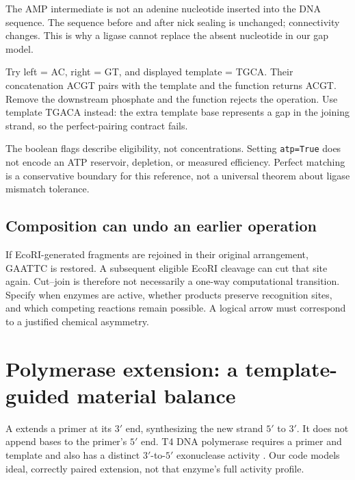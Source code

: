 
The AMP intermediate is not an adenine nucleotide inserted into the DNA sequence. The sequence before and after nick sealing is unchanged; connectivity changes. This is why a ligase cannot replace the absent nucleotide in our gap model.


Try left = AC, right = GT, and displayed template = TGCA. Their concatenation ACGT pairs with the template and the function returns ACGT. Remove the downstream phosphate and the function rejects the operation. Use template TGACA instead: the extra template base represents a gap in the joining strand, so the perfect-pairing contract fails.

The boolean flags describe eligibility, not concentrations. Setting \texttt{atp=True} does not encode an ATP reservoir, depletion, or measured efficiency. Perfect matching is a conservative boundary for this reference, not a universal theorem about ligase mismatch tolerance.

\subsection{Composition can undo an earlier operation}

If EcoRI-generated fragments are rejoined in their original arrangement, GAATTC is restored. A subsequent eligible EcoRI cleavage can cut that site again. Cut--join is therefore not necessarily a one-way computational transition. Specify when enzymes are active, whether products preserve recognition sites, and which competing reactions remain possible. A logical arrow must correspond to a justified chemical asymmetry.

\section{Polymerase extension: a template-guided material balance}

A  extends a primer at its $3'$ end, synthesizing the new strand $5'$ to $3'$. It does not append bases to the primer's $5'$ end. T4 DNA polymerase requires a primer and template and also has a distinct $3'$-to-$5'$ exonuclease activity \cite{polymerase}. Our code models ideal, correctly paired extension, not that enzyme's full activity profile.

